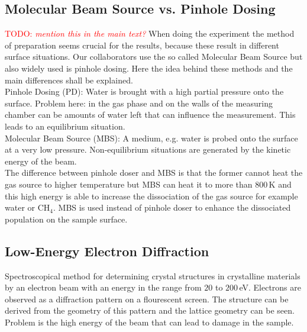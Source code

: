 \documentclass[11pt,DIV=13,BCOR=5mm,a4paper,headinclude]{scrbook}
\newcommand\todo[1]{\textcolor{red}{TODO: \textit{{#1}}}}
\begin{document}
\subsection{Molecular Beam Source vs. Pinhole Dosing}
\todo{mention this in the main text?}
When doing the experiment the method of preparation seems crucial for the results, because these result in different surface situations.
Our collaborators use the so called Molecular Beam Source but also widely used is pinhole dosing.
Here the idea behind these methods and the main differences shall be explained.
\\
Pinhole Dosing (PD): Water is brought with a high partial pressure onto the surface.
Problem here: in the gas phase and on the walls of the measuring chamber can be amounts of water left that can influence the measurement.
This leads to an equilibrium situation.
\\
Molecular Beam Source (MBS): A medium, e.g. water is probed onto the surface at a very low pressure.
Non-equilibrium situations are generated by the kinetic energy of the beam.
\\
The difference between pinhole doser and MBS is that the former cannot heat the gas source to higher temperature but MBS can heat it to more than $800\,$K and this high energy is able to increase the dissociation of the gas source for example water or CH$_4$.
MBS is used instead of pinhole doser to enhance the dissociated population on the sample surface.

\subsection{Low-Energy Electron Diffraction}
Spectroscopical method for determining crystal structures in crystalline materials by an electron beam with an energy in the range from $20$ to $200\,$eV.
Electrons are observed as a diffraction pattern on a flourescent screen.
The structure can be derived from the geometry of this pattern and the lattice geometry can be seen.
Problem is the high energy of the beam that can lead to damage in the sample.
\def\thefigure{B.\arabic{figure}}
\def\thetable{B.\arabic{table}}
\end{document}
